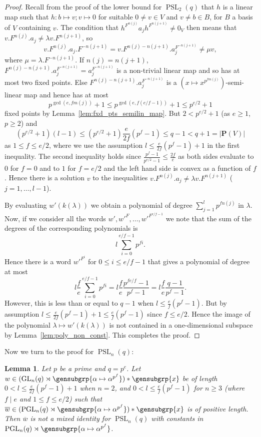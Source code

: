 \documentclass[a4paper,11pt]{amsproc}
\newcommand{\card}[1]{\left\lvert#1\right\rvert}%
\DeclareMathOperator{\GL}{GL}%
\DeclareMathOperator{\PSL}{PSL}%
\DeclareMathOperator{\PGL}{PGL}%
\newcommand{\proj}{\mathbf P}%
\theoremstyle{plain}
\newtheorem{lemma}{Lemma}[section]
\theoremstyle{definition}
\begin{document}
\begin{proof}
		Recall from the proof of the lower bound for $\PSL_2(q)$ that $h$ is a linear map such that $h\colon b\mapsto v; v\mapsto 0$ for suitable $0 \neq v \in V$ and $v \neq b \in B$, for $B$ a basis of $V$ containing $v$. The condition that $h^{F^{n(j)}}a_j h^{F^{n(j+1)}}\neq 0_V$ then means that $v.F^{n(j)}.a_j\neq\lambda v.F^{n(j+1)}$, so 
		$$
		v.F^{n(j)}.a_j.F^{-n(j+1)}=v.F^{n(j)-n(j+1)}.a_j^{F^{-n(j+1)}}\neq\mu v,
		$$
		where $\mu=\lambda.F^{-n(j+1)}$. If $n(j)=n(j+1)$, $F^{n(j)-n(j+1)}.a_j^{F^{-n(j+1)}}=a_j^{F^{-n(j+1)}}$ is a non-trivial linear map and so has at most two fixed points. Else $F^{n(j)-n(j+1)}.a_j^{F^{-n(j+1)}}$ is a $(x\mapsto x^{p^{f m(j)}})$-semi-linear map and hence has at most 
		$$
		p^{\gcd(e,f m(j))}+1\leq p^{\gcd(e,f(e/f-1))}+1\leq p^{e/2}+1
		$$ 
		fixed points by Lemma~\ref{lem:fxd_pts_semilin_map}. But $2<p^{e/2}+1$ (as $e\geq1$, $p\geq2$) and 
		$$
		(p^{e/2}+1)(l-1)\leq (p^{e/2}+1)\frac{e}{2f}(p^f-1)\leq q-1<q+1=\card{\proj(V)}
		$$ 
		as $1\leq f\leq e/2$, where we use the assumption $l\leq\frac{e}{2f}(p^f-1)+1$ in the first inequality. The second inequality holds since $\frac{p^f-1}{p^{e/2}-1}\leq\frac{2f}{e}$ as both sides evaluate to $0$ for $f=0$ and to $1$ for $f=e/2$ and the left hand side is convex as a function of $f$. Hence there is a solution $v$ to the inequalities $v.F^{n(j)}.a_j\neq\lambda v.F^{n(j+1)}$ ($j=1,\ldots,l-1$).
		
		By evaluating $w'(k(\lambda))$ we obtain a polynomial of degree $\sum_{j=1}^l{p^{fn(j)}}$ in $\lambda$. Now, if we consider all the words $w',w'^F,\ldots,w'^{F^{e/f-1}}$ we note that the sum of the degrees of the corresponding polynomials is 
		$$
		l\sum_{i=0}^{e/f-1}{p^{fi}}.
		$$ 
		Hence there is a word $w'^{F^i}$ for $0 \leq i \leq e/f-1$ that gives a polynomial of degree at most 
		$$
		l\frac{f}{e}\sum_{i=0}^{e/f-1}{p^{fi}}=l\frac{f}{e}\frac{p^{fe/f}-1}{p^f-1}=l\frac{f}{e}\frac{q-1}{p^f-1}.$$ 
		However, this is less than or equal to $q-1$ when $l\leq \frac{e}{f}(p^f-1)$. But by assumption $l\leq\frac{e}{2f}(p^f-1)+1\leq\frac{e}{f}(p^f-1)$ since $f\leq e/2$. Hence the image of the polynomial $\lambda\mapsto w'(k(\lambda))$ is not contained in a one-dimensional subspace by Lemma~\ref{lem:poly_non_const}. This completes the proof.
	\end{proof}
	
	Now we turn to the proof for $\PSL_n(q)$:
	
	\begin{lemma}\label{lem:lwr_bd_aut_ids_psl_n}
		Let $p$ be a prime and $q=p^e$. Let $w\in(\GL_n(q)\rtimes\gensubgrp{\alpha\mapsto\alpha^{p^f}})\ast\gensubgrp{x}$ be of length $0<l\leq\frac{e}{2f}(p^f-1)+1$ when $n=2$, and $0<l\leq\frac{e}{f}(p^f-1)$ for $n\geq3$ (where $f\mid e$ and $1\leq f\leq e/2$) such that $\overline{w}\in(\PGL_n(q)\rtimes\gensubgrp{\alpha\mapsto\alpha^{p^f}})\ast\gensubgrp{x}$ is of positive length. Then $\overline{w}$ is not a mixed identity for $\PSL_n(q)$ with constants in $\PGL_n(q)\rtimes\gensubgrp{\alpha\mapsto\alpha^{p^f}}$.
	\end{lemma}
	
\end{document}
